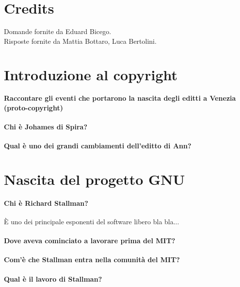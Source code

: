 \documentclass[a4paper]{article}
\begin{document}
	\section{Credits}
	Domande fornite da Eduard Bicego. \\
	Risposte fornite da Mattia Bottaro, Luca Bertolini.
	
	\section{Introduzione al copyright}
	
	\paragraph{Raccontare gli eventi che portarono la nascita degli editti a Venezia (proto-copyright)}
	
	\paragraph{Chi è Johames di Spira?} %
	
	\paragraph{Qual è uno dei grandi cambiamenti dell'editto di Ann?}
	
	
	\section{Nascita del progetto GNU}
	
	\paragraph{Chi è Richard Stallman?}
	È uno dei principale esponenti del software libero bla bla...
	\paragraph{Dove aveva cominciato a lavorare prima del MIT?}
	
	\paragraph{Com'è che Stallman entra nella comunità del MIT?}
	
	\paragraph{Qual è il lavoro di Stallman?}
	
\end{document}
